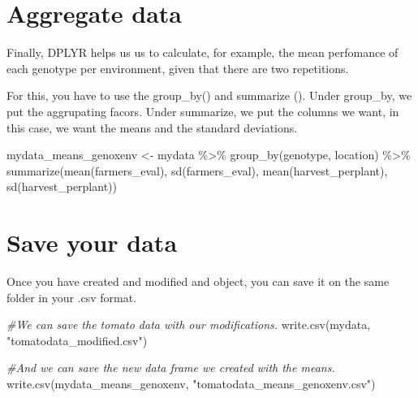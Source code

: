 \documentclass[
]{book}
\newenvironment{Shaded}{\begin{snugshade}}{\end{snugshade}}
\newcommand{\CommentTok}[1]{\textcolor[rgb]{0.56,0.35,0.01}{\textit{#1}}}
\newcommand{\FunctionTok}[1]{\textcolor[rgb]{0.00,0.00,0.00}{#1}}
\newcommand{\NormalTok}[1]{#1}
\newcommand{\OtherTok}[1]{\textcolor[rgb]{0.56,0.35,0.01}{#1}}
\newcommand{\SpecialCharTok}[1]{\textcolor[rgb]{0.00,0.00,0.00}{#1}}
\newcommand{\StringTok}[1]{\textcolor[rgb]{0.31,0.60,0.02}{#1}}
\begin{document}
\hypertarget{aggregate-data}{%
\section{Aggregate data}\label{aggregate-data}}

Finally, DPLYR helps us us to calculate, for example, the mean perfomance of each genotype per environment, given that there are two repetitions.

For this, you have to use the group\_by() and summarize (). Under group\_by, we put the aggrupating facors. Under summarize, we put the columns we want, in this case, we want the means and the standard deviations.

\begin{Shaded}
\begin{Highlighting}[]
\NormalTok{mydata\_means\_genoxenv }\OtherTok{\textless{}{-}}\NormalTok{ mydata }\SpecialCharTok{\%\textgreater{}\%}
              \FunctionTok{group\_by}\NormalTok{(genotype, location) }\SpecialCharTok{\%\textgreater{}\%}
              \FunctionTok{summarize}\NormalTok{(}\FunctionTok{mean}\NormalTok{(farmers\_eval),}
                          \FunctionTok{sd}\NormalTok{(farmers\_eval),}
                          \FunctionTok{mean}\NormalTok{(harvest\_perplant),}
                         \FunctionTok{sd}\NormalTok{(harvest\_perplant))}
\end{Highlighting}
\end{Shaded}

\hypertarget{save-your-data}{%
\section{Save your data}\label{save-your-data}}

Once you have created and modified and object, you can save it on the same folder in your .csv format.

\begin{Shaded}
\begin{Highlighting}[]
\CommentTok{\#We can save the tomato data with our modifications.}
\FunctionTok{write.csv}\NormalTok{(mydata, }\StringTok{"tomatodata\_modified.csv"}\NormalTok{)}

\CommentTok{\#And we can save the new data frame we created with the means.}
\FunctionTok{write.csv}\NormalTok{(mydata\_means\_genoxenv, }\StringTok{"tomatodata\_means\_genoxenv.csv"}\NormalTok{)}
\end{Highlighting}
\end{Shaded}
\end{document}
